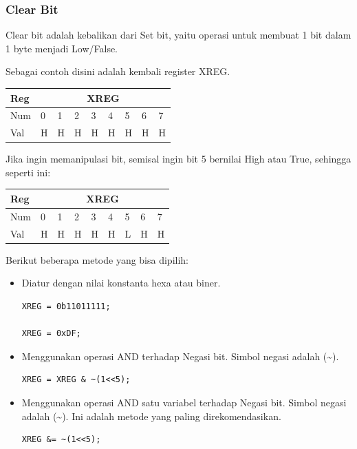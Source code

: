 \documentclass[12pt,]{article}
\begin{document}
	\subsubsection{Clear Bit}
	
	Clear bit adalah kebalikan dari Set bit, yaitu operasi untuk membuat 1 bit dalam 1 byte menjadi Low/False.
	
	Sebagai contoh disini adalah kembali register XREG.

	\begin{table}[H]
		\begin{tabular}{|l|l|l|l|l|l|l|l|l|}
			\hline
			Reg & \multicolumn{8}{c|}{XREG}     \\ \hline
			Num & 0 & 1 & 2 & 3 & 4 & 5 & 6 & 7 \\ \hline
			Val & H & H & H & H & H & H & H & H \\ \hline
		\end{tabular}
	\end{table}

	Jika ingin memanipulasi bit, semisal ingin bit 5 bernilai High atau True, sehingga seperti ini:
	\begin{table}[H]
		\begin{tabular}{|l|l|l|l|l|l|l|l|l|}
			\hline
			Reg & \multicolumn{8}{c|}{XREG}     \\ \hline
			Num & 0 & 1 & 2 & 3 & 4 & 5 & 6 & 7 \\ \hline
			Val & H & H & H & H & H & L & H & H \\ \hline
		\end{tabular}
	\end{table}
	
	Berikut beberapa metode yang bisa dipilih:
	\begin{itemize}
		\item Diatur dengan nilai konstanta hexa atau biner.
		\begin{verbatim}
XREG = 0b11011111;
		
XREG = 0xDF;
		\end{verbatim}
		
		\item Menggunakan operasi AND terhadap Negasi bit.
		Simbol negasi adalah (\textasciitilde).
		\begin{verbatim}
XREG = XREG & ~(1<<5);
		\end{verbatim}
		
		\item Menggunakan operasi AND satu variabel terhadap Negasi bit.
		Simbol negasi adalah (\textasciitilde).
		Ini adalah metode yang paling direkomendasikan.
		\begin{verbatim}
XREG &= ~(1<<5);
		\end{verbatim}
	\end{itemize}
\end{document}

